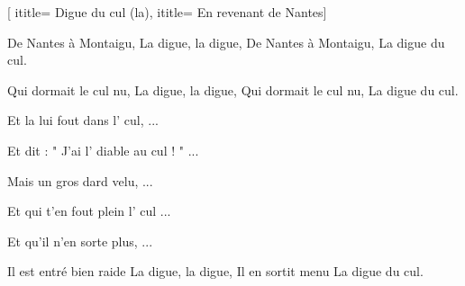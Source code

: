  [
ititle= {Digue du cul (la)},
ititle= {En revenant de Nantes}]


\beginverse
{}
De Nantes à Montaigu,
La digue, la digue,
De Nantes à Montaigu,
La digue du cul.
\endverse

\beginverse
{}
Qui dormait le cul nu,
La digue, la digue,
Qui dormait le cul nu,
La digue du cul.
\endverse

\beginverse
{}
Et la lui fout dans l' cul, ...
\endverse

\beginverse
{}
Et dit : " J'ai l' diable au cul ! " ...
\endverse

\beginverse
{}
Mais un gros dard velu, ...
\endverse

\beginverse
{}
Et qui t'en fout plein l' cul ...
\endverse

\beginverse
{}
Et qu'il n'en sorte plus, ...
\endverse

\beginverse
{}
Il est entré bien raide
La digue, la digue,
Il en sortit menu
La digue du cul.
\endverse

\endsong